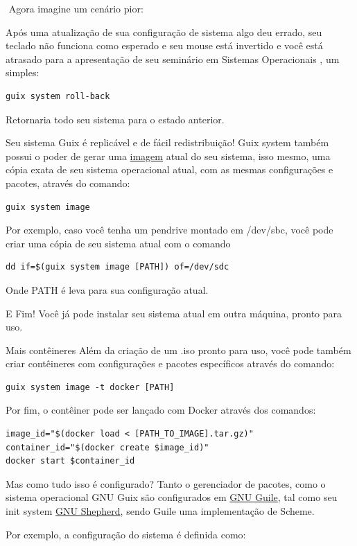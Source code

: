 \documentclass[bigger]{beamer}
\begin{document}
\begin{frame}[label={sec:org8d31687},fragile]{⁤}
 Agora imagine um cenário pior:

Após uma atualização de sua configuração de sistema algo deu errado,
seu teclado não funciona como esperado e seu mouse está invertido e você está atrasado para a apresentação de
seu seminário em Sistemas Operacionais , um simples:
\begin{verbatim}
guix system roll-back
\end{verbatim}
Retornaria todo seu sistema para o estado anterior.
\end{frame}
\begin{frame}[label={sec:org1b7a2c0},fragile]{Seu sistema Guix é replicável e de fácil redistribuição!}
 Guix system também possui o poder de gerar uma \href{https://guix.gnu.org/manual/en/html\_node/Invoking-guix-system.html\#index-image\_002c-creating-disk-images}{imagem} atual do seu sistema, isso mesmo, uma cópia exata de
seu sistema operacional atual, com as mesmas configurações e pacotes, através do comando:
\begin{verbatim}
guix system image
\end{verbatim}
Por exemplo, caso você tenha um pendrive montado em /dev/sbc, você pode criar uma cópia de seu sistema atual
com o comando
\begin{verbatim}
dd if=$(guix system image [PATH]) of=/dev/sdc
\end{verbatim}
Onde PATH é leva para sua configuração atual.

E Fim! Você já pode instalar seu sistema atual em outra máquina, pronto para uso.
\end{frame}
\begin{frame}[label={sec:org0670dfd},fragile]{Mais contêineres}
 Além da criação de um .iso pronto para uso, você pode também criar contêineres com configurações e pacotes
específicos através do comando:
\begin{verbatim}
guix system image -t docker [PATH]
\end{verbatim}

Por fim, o contêiner pode ser lançado com Docker através dos comandos:
\begin{verbatim}
image_id="$(docker load < [PATH_TO_IMAGE].tar.gz)"
container_id="$(docker create $image_id)"
docker start $container_id
\end{verbatim}
\end{frame}
\begin{frame}[label={sec:org096f86e}]{Mas como tudo isso é configurado?}
Tanto o gerenciador de pacotes, como o sistema operacional GNU Guix são configurados em \href{https://www.gnu.org/software/guile/}{GNU Guile}, tal como
seu init system \href{https://www.gnu.org/software/shepherd/}{GNU Shepherd}, sendo Guile uma implementação de Scheme.

Por exemplo, a configuração do sistema é definida como:
\end{frame}
\end{document}
